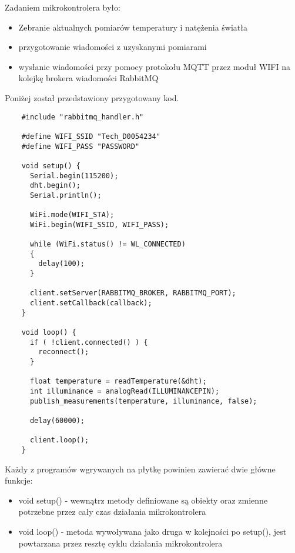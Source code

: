 Zadaniem mikrokontrolera było:

\begin{itemize} %
    \item Zebranie aktualnych pomiarów temperatury i natężenia światła
    \item przygotowanie wiadomości z uzyskanymi pomiarami
    \item wysłanie wiadomości przy pomocy protokołu MQTT przez moduł WIFI na 
    kolejkę brokera wiadomości RabbitMQ
\end{itemize}

Poniżej został przedstawiony przygotowany kod.

\begin{lstlisting}
    #include "rabbitmq_handler.h"

    #define WIFI_SSID "Tech_D0054234"
    #define WIFI_PASS "PASSWORD"
     
    void setup() {
      Serial.begin(115200);
      dht.begin();
      Serial.println();
     
      WiFi.mode(WIFI_STA);
      WiFi.begin(WIFI_SSID, WIFI_PASS);
     
      while (WiFi.status() != WL_CONNECTED)
      {
        delay(100);
      }
      
      client.setServer(RABBITMQ_BROKER, RABBITMQ_PORT);
      client.setCallback(callback);
    }
     
    void loop() {
      if ( !client.connected() ) {
        reconnect();
      }
      
      float temperature = readTemperature(&dht);
      int illuminance = analogRead(ILLUMINANCEPIN);
      publish_measurements(temperature, illuminance, false);
      
      delay(60000);
    
      client.loop();
    }
\end{lstlisting}

Każdy z programów wgrywanych na płytkę powinien zawierać dwie główne funkcje:

\begin{itemize}
    \item void setup() - wewnątrz metody definiowane są obiekty oraz zmienne 
    potrzebne przez cały czas działania mikrokontrolera
    \item void loop() - metoda wywoływana jako druga w kolejności po setup(),
    jest powtarzana przez resztę cyklu działania mikrokontrolera 
\end{itemize}

